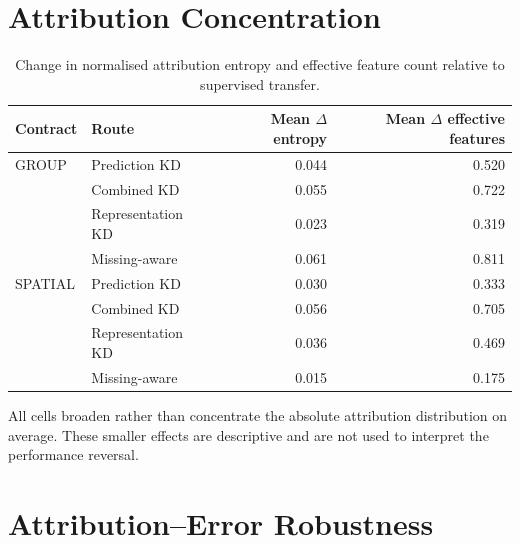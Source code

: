 \documentclass[runningheads]{venue/lncs/llncs}
\begin{document}
\section{Attribution Concentration}

\begin{table}[h]
\centering
\caption{Change in normalised attribution entropy and effective feature count relative to supervised transfer.}
\small
\setlength{\tabcolsep}{4pt}
\begin{tabular}{llrr}
\toprule
Contract & Route & \shortstack{Mean $\Delta$\\entropy} & \shortstack{Mean $\Delta$\\effective features}\\
\midrule
GROUP & Prediction KD & 0.044 & 0.520\\
& Combined KD & 0.055 & 0.722\\
& Representation KD & 0.023 & 0.319\\
& Missing-aware & 0.061 & 0.811\\
\midrule
SPATIAL & Prediction KD & 0.030 & 0.333\\
& Combined KD & 0.056 & 0.705\\
& Representation KD & 0.036 & 0.469\\
& Missing-aware & 0.015 & 0.175\\
\bottomrule
\end{tabular}
\end{table}

All cells broaden rather than concentrate the absolute attribution distribution on average. These smaller effects are descriptive and are not used to interpret the performance reversal.

\section{Attribution--Error Robustness}
\end{document}
